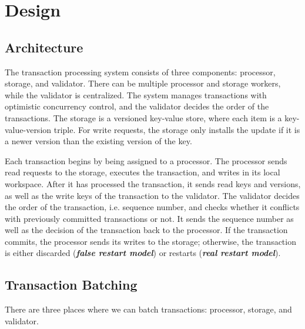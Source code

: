 
\section{Design}

\subsection{Architecture}
The transaction processing system consists of three components: processor, storage, and validator.  
There can be multiple processor and storage workers, while the validator is centralized.  
The system manages transactions with optimistic concurrency control, and the validator decides the order of the transactions.
The storage is a versioned key-value store, where each item is a key-value-version triple. 
For write requests, the storage only installs the update if it is a newer version than the existing version of the key. 

Each transaction begins by being assigned to a processor. 
The processor sends read requests to the storage, executes the transaction, and writes in its local workspace. 
After it has processed the transaction, it sends read keys and versions, as well as the write keys of the transaction to the validator. 
The validator decides the order of the transaction, i.e. sequence number, and checks whether it conflicts with previously committed transactions or not. 
It sends the sequence number as well as the decision of the transaction back to the processor. 
If the transaction commits, the processor sends its writes to the storage; otherwise, the transaction is either discarded (\textbf{\emph{false restart model}}) or restarts (\textbf{\emph{real restart model}}).

\subsection{Transaction Batching}
\label{design:subsec:batching}
There are three places where we can batch transactions: processor, storage, and validator.

